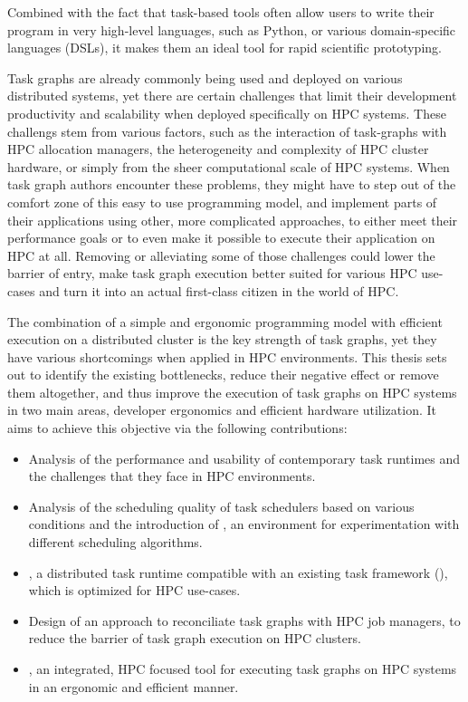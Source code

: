 Combined with the fact that task-based tools often allow users to write their program in very
high-level languages, such as Python, or various domain-specific languages (DSLs), it makes them an
ideal tool for rapid scientific prototyping.

Task graphs are already commonly being used and deployed on various distributed
systems, yet there are certain challenges that limit their development
productivity and scalability when deployed specifically on HPC systems. These challengs stem from
various factors, such as the interaction of task-graphs with HPC allocation managers, the
heterogeneity and complexity of HPC cluster hardware, or simply from the sheer computational scale
of HPC systems. When task graph authors encounter these problems, they might have to step out of
the comfort zone of this easy to use programming model, and implement parts of their applications
using other, more complicated approaches, to either meet their performance goals or to even make it
possible to execute their application on HPC at all. Removing or alleviating some of those
challenges could lower the barrier of entry, make task graph execution better suited for various
HPC use-cases and turn it into an actual first-class citizen in the world of HPC\@.

The combination of a simple and ergonomic programming model with efficient execution on a
distributed cluster is the key strength of task graphs, yet they have various shortcomings when
applied in HPC environments. This thesis sets out to identify the existing bottlenecks, reduce
their negative effect or remove them altogether, and thus improve the execution of task graphs on
HPC systems in two main areas, developer ergonomics and efficient hardware utilization. It aims to
achieve this objective via the following contributions:
\begin{itemize}
	\item Analysis of the performance and usability of contemporary task runtimes and the challenges that
	      they face in HPC environments.
	\item Analysis of the scheduling quality of task schedulers based on various conditions and the
	      introduction of \estee{}, an environment for experimentation with different scheduling
	      algorithms.
	\item \rsds{}, a distributed task runtime compatible with an existing task framework
	      (\dask{}), which is optimized for HPC use-cases.
	\item Design of an approach to reconciliate task graphs with HPC job managers, to reduce the barrier of
	      task graph execution on HPC clusters.
	\item \hyperqueue{}, an integrated, HPC focused tool for executing task graphs on HPC systems
	      in an ergonomic and efficient manner.
\end{itemize}

